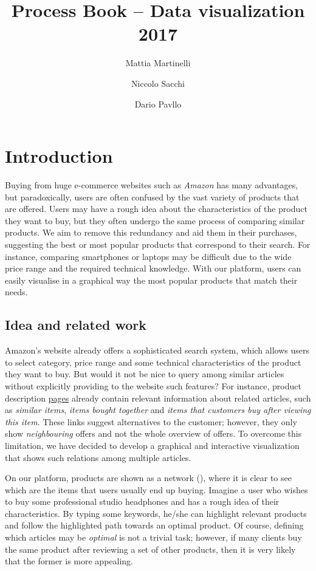 \documentclass[a4paper,12pt]{article}
\title{Process Book -- Data visualization 2017}
\author{Mattia Martinelli \and Niccolo Sacchi \and Dario Pavllo}
\date{} %
\begin{document}
\maketitle
{
	\hypersetup{linkcolor=black}
	\tableofcontents
}

\newpage
\section{Introduction}
\label{sec:introduction}
Buying from huge e-commerce websites such as \emph{Amazon} has many advantages, but paradoxically, users are often confused by the vast variety of products that are offered. Users may have a rough idea about the characteristics of the product they want to buy, but they often undergo the same process of comparing similar products. We aim to remove this redundancy and aid them in their purchases, suggesting the best or most popular products that correspond to their search. For instance, comparing smartphones or laptops may be difficult due to the wide price range and the required technical knowledge. With our platform, users can easily visualise in a graphical way the most popular products that match their needs.

\subsection{Idea and related work}
Amazon's website already offers a sophisticated search system, which allows users to select category, price range and some technical characteristics of the product they want to buy. But would it not be nice to query among similar articles without explicitly providing to the website such features? For instance, product description  \href{https://www.amazon.com/Acer-E5-575-33BM-15-6-Inch-Notebook-Generation/dp/B01K1IO3QW/ref=sr_1_3?s=pc&ie=UTF8&qid=1512207600&sr=1-3&keywords=laptop}{pages} already contain relevant information about related articles, such as \textit{similar items}, \textit{items bought together} and \textit{items that customers buy after viewing this item}. These links suggest alternatives to the customer; however, they only show \textit{neighbouring} offers and not the whole overview of offers. To overcome this limitation, we have decided to develop a graphical and interactive visualization that shows such relations among multiple articles.

On our platform, products are shown as a network (), where it is clear to see which are the items that users usually end up buying. Imagine a user who wishes to buy some professional studio headphones and has a rough idea of their characteristics. By typing some keywords, he/she can highlight relevant products and follow the highlighted path towards an optimal product. Of course, defining which articles may be \emph{optimal} is not a trivial task; however, if many clients buy the same product after reviewing a set of other products, then it is very likely that the former is more appealing. 
\end{document}
